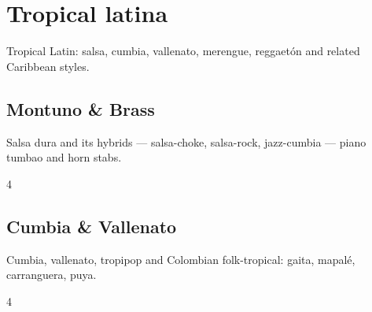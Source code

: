 \documentclass[a4paper,landscape]{memoir}
\begin{document}
\part{Tropical latina}
Tropical Latin: salsa, cumbia, vallenato, merengue, reggaet\'on and related Caribbean styles.

\chapter{Montuno \& Brass}
Salsa dura and its hybrids — salsa-choke, salsa-rock, jazz-cumbia — piano tumbao and horn stabs.
\clearpage\begin{multicols*}{4}
\end{multicols*}

\chapter{Cumbia \& Vallenato}
Cumbia, vallenato, tropipop and Colombian folk-tropical: gaita, mapalé, carranguera, puya.
\clearpage\begin{multicols*}{4}
\end{multicols*}
\end{document}
